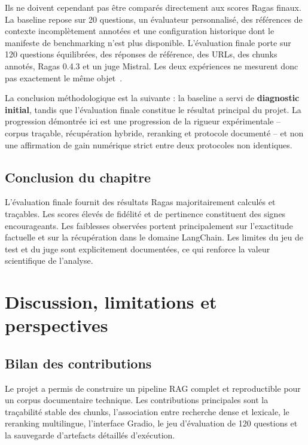 \documentclass[12pt,a4paper,oneside]{report}
\begin{document}
Ils ne doivent cependant pas être comparés directement aux scores Ragas finaux.
La baseline repose sur 20 questions, un évaluateur personnalisé, des références
de contexte incomplètement annotées et une configuration historique dont le
manifeste de benchmarking n'est plus disponible. L'évaluation finale porte sur
120 questions équilibrées, des réponses de référence, des URLs, des chunks
annotés, Ragas 0.4.3 et un juge Mistral. Les deux expériences ne mesurent donc
pas exactement le même objet~\cite{baselineArtifact,es2023ragas}.

La conclusion méthodologique est la suivante : la baseline a servi de
\textbf{diagnostic initial}, tandis que l'évaluation finale constitue le résultat
principal du projet. La progression démontrée ici est une progression de la
rigueur expérimentale -- corpus traçable, récupération hybride, reranking et
protocole documenté -- et non une affirmation de gain numérique strict entre
deux protocoles non identiques.

\section*{Conclusion du chapitre}

L'évaluation finale fournit des résultats Ragas majoritairement calculés et
traçables. Les scores élevés de fidélité et de pertinence constituent des signes
encourageants. Les faiblesses observées portent principalement sur l'exactitude
factuelle et sur la récupération dans le domaine LangChain. Les limites du jeu
de test et du juge sont explicitement documentées, ce qui renforce la valeur
scientifique de l'analyse.

\chapter{Discussion, limitations et perspectives}
\label{chap:discussion}

\section{Bilan des contributions}

Le projet a permis de construire un pipeline RAG complet et reproductible pour
un corpus documentaire technique. Les contributions principales sont la
traçabilité stable des chunks, l'association entre recherche dense et lexicale,
le reranking multilingue, l'interface Gradio, le jeu d'évaluation de 120
questions et la sauvegarde d'artefacts détaillés d'exécution.
\end{document}
